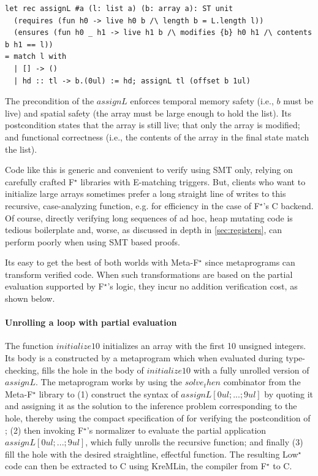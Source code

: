 \documentclass[runningheads]{llncs}
\newcommand\fstar{F$^\star$\xspace}
\newcommand\metafstar{Meta-F$^\star$\xspace}
\newcommand\lowstar{Low$^\star$\xspace}
\begin{document}
\begin{lstlisting}
let rec assignL #a (l: list a) (b: array a): ST unit
  (requires (fun h0 -> live h0 b /\ length b = L.length l))
  (ensures (fun h0 _ h1 -> live h1 b /\ modifies {b} h0 h1 /\ contents b h1 == l))
= match l with
  | [] -> ()
  | hd :: tl -> b.(0ul) := hd; assignL tl (offset b 1ul)
\end{lstlisting}

The precondition of the \ls$assignL$ enforces temporal memory safety
(i.e., \ls$b$ must be live) and spatial safety (the array must be
large enough to hold the list). Its postcondition states that the
array is still live; that only the array is modified; and functional
correctness (i.e., the contents of the array in the final state match
the list).

Code like this is generic and convenient to verify using SMT only,
relying on carefully crafted \fstar libraries with E-matching
triggers. But, clients who want to initialize large arrays sometimes
prefer a long straight line of writes to this recursive,
case-analyzing function, e.g. for efficiency in the case of \fstar's C
backend. Of course, directly
verifying long sequences 
of ad hoc, heap mutating code is tedious boilerplate and, worse, as
discussed in depth in \autoref{sec:registers}, can perform poorly when
using SMT based proofs.

Its easy to get the best of both worlds with \metafstar since
metaprograms can transform verified code. When such transformations
are based on the partial evaluation supported by \fstar's logic, they
incur no addition verification cost, as shown below.

\paragraph{Unrolling a loop with partial evaluation}
The function \ls$initialize10$ initializes an array with the first 10
unsigned integers. Its body is a constructed by a metaprogram which
when evaluated during type-checking, fills the hole in the body
of \ls$initialize10$ with a fully unrolled version of \ls$assignL$.
The metaprogram works by using the \ls$solve_then$ combinator from
the \metafstar library to (1) construct the syntax of
%
\ls$assignL [0ul;...;9ul]$ by quoting it and assigning it
as the solution to the inference problem corresponding to the hole,
thereby using the compact specification of  for
verifying the postcondition of ;
%
(2) then invoking \fstar's normalizer to evaluate the partial
application \ls$assignL [0ul;...;9ul]$, which fully unrolls the
recursive function; and finally (3) fill the hole with the desired
straightline, effectful function. The resulting \lowstar code can then
be extracted to C using KreMLin, the compiler from \fstar to C.
\end{document}
